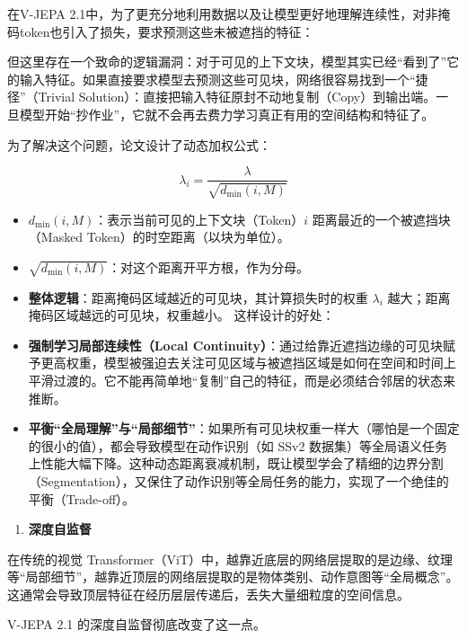 在V-JEPA 2.1中，为了更充分地利用数据以及让模型更好地理解连续性，对非掩码token也引入了损失，要求预测这些未被遮挡的特征：

但这里存在一个致命的逻辑漏洞：对于可见的上下文块，模型其实已经``看到了''它的输入特征。如果直接要求模型去预测这些可见块，网络很容易找到一个``捷径''（Trivial Solution）：直接把输入特征原封不动地复制（Copy）到输出端。一旦模型开始``抄作业''，它就不会再去费力学习真正有用的空间结构和特征了。

为了解决这个问题，论文设计了动态加权公式：

\[
\lambda_i = \frac{\lambda}{\sqrt{d_{\min}(i, M)}}
\]

\begin{itemize}
\item
  \(d_{\min}(i, M)\)：表示当前可见的上下文块（Token）\(i\) 距离最近的一个被遮挡块（Masked Token）的时空距离（以块为单位）。
\item
  \(\sqrt{d_{\min}(i, M)}\)：对这个距离开平方根，作为分母。
\item
  \textbf{整体逻辑}：距离掩码区域越近的可见块，其计算损失时的权重 \(\lambda_i\) 越大；距离掩码区域越远的可见块，权重越小。
  这样设计的好处：
\item
  \textbf{强制学习局部连续性（Local Continuity）}：通过给靠近遮挡边缘的可见块赋予更高权重，模型被强迫去关注可见区域与被遮挡区域是如何在空间和时间上平滑过渡的。它不能再简单地``复制''自己的特征，而是必须结合邻居的状态来推断。
\item
  \textbf{平衡``全局理解''与``局部细节''}：如果所有可见块权重一样大（哪怕是一个固定的很小的值），都会导致模型在动作识别（如 SSv2 数据集）等全局语义任务上性能大幅下降。这种动态距离衰减机制，既让模型学会了精细的边界分割（Segmentation），又保住了动作识别等全局任务的能力，实现了一个绝佳的平衡（Trade-off）。
\end{itemize}

\begin{enumerate}
\def\labelenumi{\arabic{enumi}.}
\setcounter{enumi}{2}
\tightlist
\item
  \textbf{深度自监督}
\end{enumerate}

在传统的视觉 Transformer（ViT）中，越靠近底层的网络层提取的是边缘、纹理等``局部细节''，越靠近顶层的网络层提取的是物体类别、动作意图等``全局概念''。这通常会导致顶层特征在经历层层传递后，丢失大量细粒度的空间信息。

V-JEPA 2.1 的深度自监督彻底改变了这一点。

